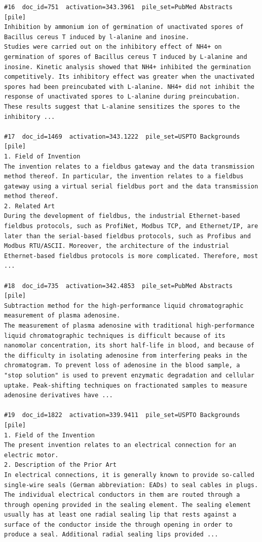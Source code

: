\begin{verbatim}
#16  doc_id=751  activation=343.3961  pile_set=PubMed Abstracts  [pile]
Inhibition by ammonium ion of germination of unactivated spores of Bacillus cereus T induced by l-alanine and inosine.
Studies were carried out on the inhibitory effect of NH4+ on germination of spores of Bacillus cereus T induced by L-alanine and inosine. Kinetic analysis showed that NH4+ inhibited the germination competitively. Its inhibitory effect was greater when the unactivated spores had been preincubated with L-alanine. NH4+ did not inhibit the response of unactivated spores to L-alanine during preincubation. These results suggest that L-alanine sensitizes the spores to the inhibitory ...

#17  doc_id=1469  activation=343.1222  pile_set=USPTO Backgrounds  [pile]
1. Field of Invention
The invention relates to a fieldbus gateway and the data transmission method thereof. In particular, the invention relates to a fieldbus gateway using a virtual serial fieldbus port and the data transmission method thereof.
2. Related Art
During the development of fieldbus, the industrial Ethernet-based fieldbus protocols, such as ProfiNet, Modbus TCP, and Ethernet/IP, are later than the serial-based fieldbus protocols, such as Profibus and Modbus RTU/ASCII. Moreover, the architecture of the industrial Ethernet-based fieldbus protocols is more complicated. Therefore, most ...

#18  doc_id=735  activation=342.4853  pile_set=PubMed Abstracts  [pile]
Subtraction method for the high-performance liquid chromatographic measurement of plasma adenosine.
The measurement of plasma adenosine with traditional high-performance liquid chromatographic techniques is difficult because of its nanomolar concentration, its short half-life in blood, and because of the difficulty in isolating adenosine from interfering peaks in the chromatogram. To prevent loss of adenosine in the blood sample, a "stop solution" is used to prevent enzymatic degradation and cellular uptake. Peak-shifting techniques on fractionated samples to measure adenosine derivatives have ...

#19  doc_id=1822  activation=339.9411  pile_set=USPTO Backgrounds  [pile]
1. Field of the Invention
The present invention relates to an electrical connection for an electric motor.
2. Description of the Prior Art
In electrical connections, it is generally known to provide so-called single-wire seals (German abbreviation: EADs) to seal cables in plugs. The individual electrical conductors in them are routed through a through opening provided in the sealing element. The sealing element usually has at least one radial sealing lip that rests against a surface of the conductor inside the through opening in order to produce a seal. Additional radial sealing lips provided ...


\end{verbatim}
